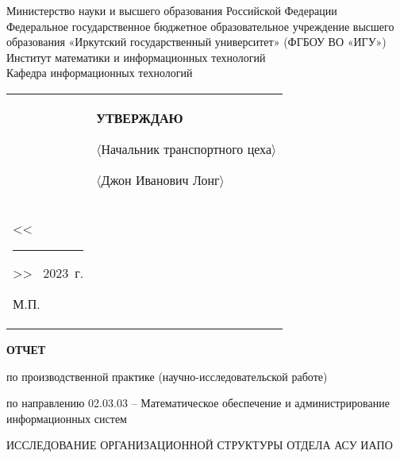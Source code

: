 \documentclass[732]{studrep}
\begin{document}
\thispagestyle{empty}
\begin{center}
Министерство науки и высшего образования Российской Федерации\\
Федеральное государственное бюджетное образовательное учреждение высшего образования
«Иркутский государственный университет»
(ФГБОУ ВО «ИГУ»)\\%
Институт математики и информационных технологий\\%
Кафедра информационных технологий\\%
\end{center}
\vspace{-1em}
\noindent\begin{tabularx}{\textwidth} {
  >{\raggedright\arraybackslash}X
  >{\raggedright}X }
&
  \begin{center}
    \textbf{УТВЕРЖДАЮ}
  \end{center}%
\vspace{-1em}
  \noindent $\langle$Начальник транспортного цеха$\rangle$

  \noindent $\langle$Джон Иванович Лонг$\rangle$ \\[0.3em]

  \noindent <<\rule{1cm}{0.5pt}>> \hrulefill\ 2023~г. %

\vspace{-1em}
  \begin{center}
    М.П.
  \end{center}

\end{tabularx}
\begin{center}
  \textbf{\large ОТЧЕТ}

  по производственной практике (научно-исследовательской работе)
\vspace{1em}

по направлению 02.03.03 -- Математическое обеспечение и администрирование информационных систем


\vspace{2em}
 ИССЛЕДОВАНИЕ ОРГАНИЗАЦИОННОЙ СТРУКТУРЫ ОТДЕЛА АСУ ИАПО

\end{center}
\end{document}
